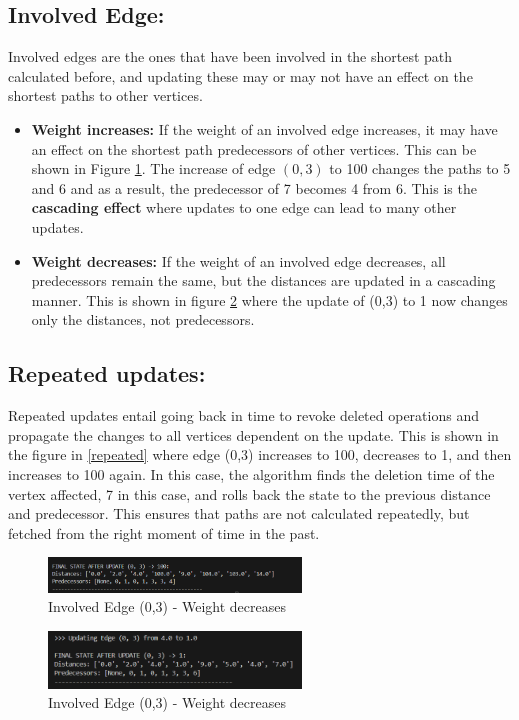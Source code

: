 \documentclass[12pt]{article}
\begin{document}
\subsection*{Involved Edge:}
Involved edges are the ones that have been involved in the shortest path calculated before, and updating these may or may not have an effect on the shortest paths to other vertices. 
\begin{itemize}
    \item \textbf{Weight increases:} If the weight of an involved edge increases, it may have an effect on the shortest path predecessors of other vertices. This can be shown in Figure \ref{fig:cascading}. The increase of edge $(0,3)$ to 100 changes the paths to 5 and 6 and as a result, the predecessor of 7 becomes 4 from 6. This is the \textbf{cascading effect} where updates to one edge can lead to many other updates.
    \item \textbf{Weight decreases:} If the weight of an involved edge decreases, all predecessors remain the same, but the distances are updated in a cascading manner. This is shown in figure \ref{fig:cascadingdec} where the update of (0,3) to 1 now changes only the distances, not predecessors.
    
\end{itemize}


\subsection*{Repeated updates:}
Repeated updates entail going back in time to revoke deleted operations and propagate the changes to all vertices dependent on the update. This is shown in the figure in \ref{repeated} where edge (0,3) increases to 100, decreases to 1, and then increases to 100 again. In this case, the algorithm finds the deletion time of the vertex affected, 7 in this case, and rolls back the state to the previous distance and predecessor. This ensures that paths are not calculated repeatedly, but fetched from the right moment of time in the past. 

\begin{figure}[h!]
    \centering
    \includegraphics[width=0.6\textwidth]{cascading.png}
    \caption{Involved Edge (0,3) - Weight decreases} 
    \label{fig:cascading}
\end{figure}
\begin{figure}[h!]
    \centering
    \includegraphics[width=0.6\textwidth]{cascadingdec.png}
    \caption{Involved Edge (0,3) - Weight decreases} 
    \label{fig:cascadingdec}
\end{figure}
\end{document}
